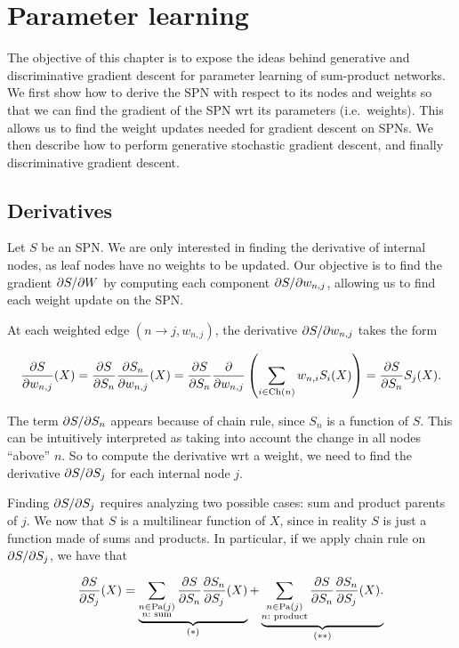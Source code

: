 \chapter{Parameter learning}\label{chp:weights}

The objective of this chapter is to expose the ideas behind generative and discriminative gradient
descent for parameter learning of sum-product networks. We first show how to derive the SPN with
respect to its nodes and weights so that we can find the gradient of the SPN wrt its parameters
(i.e.\ weights). This allows us to find the weight updates needed for gradient descent on SPNs. We
then describe how to perform generative stochastic gradient descent, and finally discriminative
gradient descent.

\section{Derivatives}

Let $S$ be an SPN\@. We are only interested in finding the derivative of internal nodes, as leaf
nodes have no weights to be updated. Our objective is to find the gradient $\partial S/\partial W$ by
computing each component $\partial S/\partial w_{n,j}$, allowing us to find each weight update on the
SPN\@.

At each weighted edge $(n\to j, w_{n,j})$, the derivative $\partial S/\partial w_{n,j}$ takes the form

\begin{equation}
  \frac{\partial S}{\partial w_{n,j}}(X)=\frac{\partial S}{\partial S_n}\frac{\partial S_n}{\partial w_{n,j}}(X)=
    \frac{\partial S}{\partial S_n}\frac{\partial}{\partial w_{n,j}}\left(\sum_{i\in\operatorname*{\text{Ch}}(n)}w_{n,i}S_i(X)\right)=
    \frac{\partial S}{\partial S_n}S_j(X).
\end{equation}

The term $\partial S/\partial S_n$ appears because of chain rule, since $S_n$ is a function of $S$. This
can be intuitively interpreted as taking into account the change in all nodes ``above'' $n$. So to
compute the derivative wrt a weight, we need to find the derivative $\partial S/\partial S_j$ for each
internal node $j$.

Finding $\partial S/\partial S_j$ requires analyzing two possible cases: sum and product parents of $j$.
We now that $S$ is a multilinear function of $X$, since in reality $S$ is just a function made of
sums and products. In particular, if we apply chain rule on $\partial S/\partial S_j$, we have that

\begin{equation*}
  \frac{\partial S}{\partial S_j}(X)=\underbrace{\sum_{\substack{n\in\operatorname*{\text{Pa}}(j)\\n:\text{
          sum}}}\frac{\partial S}{\partial S_n}\frac{\partial S_n}{\partial S_j}(X)}_{(\ast)}+
    \underbrace{\sum_{\substack{n\in\operatorname*{\text{Pa}}(j)\\n:\text{
            product}}}\frac{\partial S}{\partial S_n}\frac{\partial S_n}{\partial S_j}(X).}_{(\ast\ast)}
\end{equation*}

